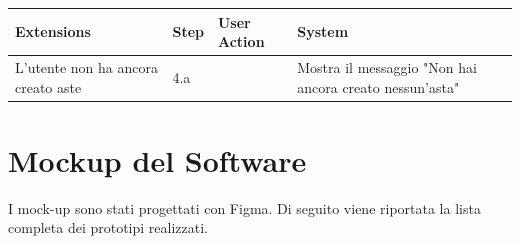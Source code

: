 \begin{table}[H]
\begin{tabularx}{\linewidth}{|p{135pt}|p{25pt}|>{\raggedright\arraybackslash}X|>{\raggedright\arraybackslash}X|}
		\hline \rowcolor[HTML]{DCDCDC}
		\textbf{\sffamily Extensions}                                 & \textbf{\sffamily Step}                                                                                                                                              & \textbf{\sffamily User Action}                                                                                                           & \textbf{\sffamily System}                               \\
		\hline\multirow{2}{135pt}{L'utente non ha ancora creato aste} & 4.a                                                                                                                                                                  &                                                                                                                                          & Mostra il messaggio "Non hai ancora creato nessun'asta" \\

		\hline
	\end{tabularx}
\end{table}

\newpage

\section{Mockup del Software}
I mock-up sono stati progettati con Figma. Di seguito viene riportata la lista completa dei prototipi realizzati.

